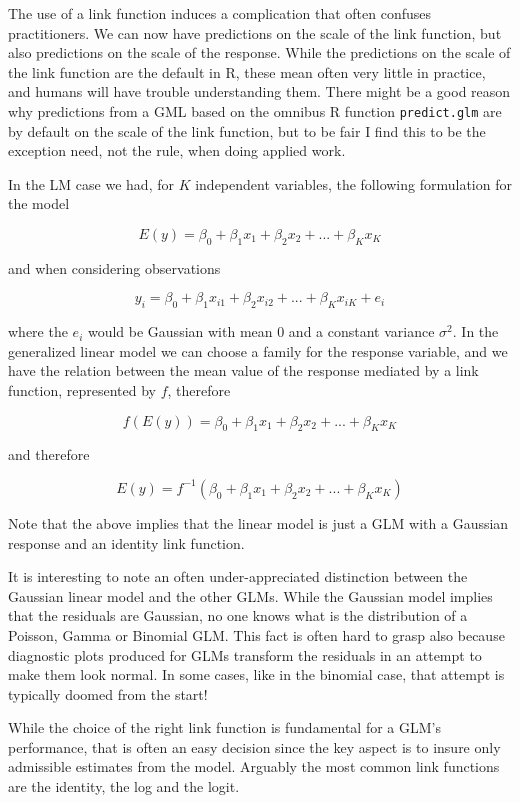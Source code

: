 \documentclass[
]{book}
\begin{document}
The use of a link function induces a complication that often confuses practitioners. We can now have predictions on the scale of the link function, but also predictions on the scale of the response. While the predictions on the scale of the link function are the default in R, these mean often very little in practice, and humans will have trouble understanding them. There might be a good reason why predictions from a GML based on the omnibus R function \texttt{predict.glm} are by default on the scale of the link function, but to be fair I find this to be the exception need, not the rule, when doing applied work.

In the LM case we had, for \(K\) independent variables, the following formulation for the model

\[E(y)=\beta_0+\beta_1x_1+\beta_2x_2+...+\beta_Kx_K\]

and when considering observations

\[y_i=\beta_0+\beta_1x_{i1}+\beta_2x_{i2}+...+\beta_Kx_{iK}+e_i\]

where the \(e_i\) would be Gaussian with mean 0 and a constant variance \(\sigma^2\). In the generalized linear model we can choose a family for the response variable, and we have the relation between the mean value of the response mediated by a link function, represented by \(f\), therefore

\[f(E(y))=\beta_0+\beta_1x_1+\beta_2x_2+...+\beta_Kx_K\]

and therefore

\[E(y)=f^{-1}(\beta_0+\beta_1x_1+\beta_2x_2+...+\beta_Kx_K)\]

Note that the above implies that the linear model is just a GLM with a Gaussian response and an identity link function.

It is interesting to note an often under-appreciated distinction between the Gaussian linear model and the other GLMs. While the Gaussian model implies that the residuals are Gaussian, no one knows what is the distribution of a Poisson, Gamma or Binomial GLM. This fact is often hard to grasp also because diagnostic plots produced for GLMs transform the residuals in an attempt to make them look normal. In some cases, like in the binomial case, that attempt is typically doomed from the start!

While the choice of the right link function is fundamental for a GLM's performance, that is often an easy decision since the key aspect is to insure only admissible estimates from the model. Arguably the most common link functions are the identity, the log and the logit.
\end{document}
